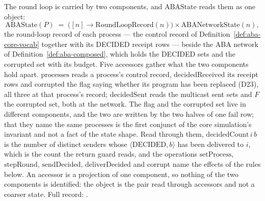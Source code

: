\begin{definition}
  \label{def:aba-core}
  \leanok
  The round loop is carried by two components, and $\mathrm{ABAState}$ reads them as one object:
  \[
    \mathrm{ABAState}(P) \;=\;
      \bigl([n] \to \mathrm{RoundLoopRecord}(n)\bigr) \times \mathrm{ABANetworkState}(n),
  \]
  the round-loop record of each process --- the control record of Definition~\ref{def:aba-core-vocab} together with its DECIDED receipt rows --- beside the ABA network of Definition~\ref{def:aba-composed}, which holds the DECIDED sets and the corrupted set with its budget.
  Five accessors gather what the two components hold apart.
  $\mathrm{processes}$ reads a process's control record, $\mathrm{decidedReceived}$ its receipt rows and $\mathrm{corrupted}$ the flag saying whether its program has been replaced (D23), all three at that process's record; $\mathrm{decidedSent}$ reads the multicast sent sets and $F$ the corrupted set, both at the network.
  The flag and the corrupted set live in different components, and the two are written by the two halves of one $\mathrm{fail}$ row; that they name the same processes is the first conjunct of the core simulation's invariant and not a fact of the state shape.
  Read through them, $\mathrm{decidedCount}\,i\,b$ is the number of distinct senders whose $\langle\mathrm{DECIDED},b\rangle$ has been delivered to $i$, which is the count the return guard reads, and the operations $\mathrm{setProcess}$, $\mathrm{stepRound}$, $\mathrm{sendDecided}$, $\mathrm{deliverDecided}$ and $\mathrm{corrupt}$ name the effects of the rules below.
  An accessor is a projection of one component, so nothing of the two components is identified: the object is the pair read through accessors and not a coarser state.
  Full record: .
\end{definition}
